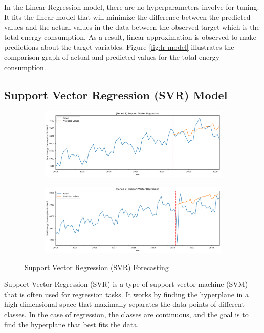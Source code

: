 \documentclass[runningheads]{llncs}
\begin{document}
In the Linear Regression model, there are no hyperparameters involve for tuning. It fits the linear model that will minimize the difference between the predicted values and the actual values in the data between the observed target which is the total energy consumption. As a result, linear approximation is observed to make predictions about the target variables. Figure \ref{fig:lr-model} illustrates the comparison graph of actual and predicted values for the total energy consumption. 

\subsection{Support Vector Regression (SVR) Model}
\begin{figure}
    \begin{subfigure}[b]{\textwidth}
         \centering
         \includegraphics[width=\textwidth]{svr/p1-SVR.png}
         \caption{}
         \label{fig:modelSVR-p1}
    \end{subfigure}
    \begin{subfigure}[b]{\textwidth}
         \centering
         \includegraphics[width=\textwidth]{svr/p2-SVR.png}
         \caption{}
         \label{fig:modelSVR-p2}
    \end{subfigure}
    \caption{Support Vector Regression (SVR) Forecasting}
    \label{fig:svr-model}
\end{figure}
Support Vector Regression (SVR) is a type of support vector machine (SVM) that is often used for regression tasks. It works by finding the hyperplane in a high-dimensional space that maximally separates the data points of different classes. In the case of regression, the classes are continuous, and the goal is to find the hyperplane that best fits the data.
\end{document}
